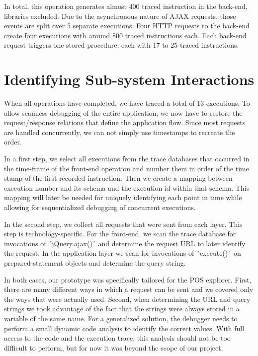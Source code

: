 In total, this operation generates almost 400 traced instruction in the back-end, libraries excluded.
Due to the asynchronous nature of AJAX requests, those events are split over 5 separate executions.
Four HTTP requests to the back-end create four executions with around 800 traced instructions each.
Each back-end request triggers one stored procedure, each with 17 to 25 traced instructions.

\section{Identifying Sub-system Interactions}

When all operations have completed, we have traced a total of 13 executions.
To allow seamless debugging of the entire application, we now have to restore the request/response relations that define the application flow.
Since most requests are handled concurrently, we can not simply use timestamps to recreate the order.

In a first step, we select all executions from the trace databases that occurred in the time-frame of the front-end operation and number them in order of the time stamp of the first recorded instruction.
Then we create a mapping between execution number and its schema and the execution id within that schema.
This mapping will later be needed for uniquely identifying each point in time while allowing for sequentialized debugging of concurrent executions.

In the second step, we collect all requests that were sent from each layer.
This step is technology-specific.
For the front-end, we scan the trace database for invocations of ´jQuery.ajax()´ and determine the request URL to later identify the request.
In the application layer we scan for invocations of ´execute()´ on prepared-statement objects and determine the query string.

In both cases, our prototype was specifically tailored for the POS explorer.
First, there are many different ways in which a request can be sent and we covered only the ways that were actually used.
Second, when determining the URL and query strings we took advantage of the fact that the strings were always stored in a variable of the same name.
For a generalized solution, the debugger needs to perform a small dynamic code analysis to identify the correct values.
With full access to the code and the execution trace, this analysis should not be too difficult to perform, but for now it was beyond the scope of our project.

